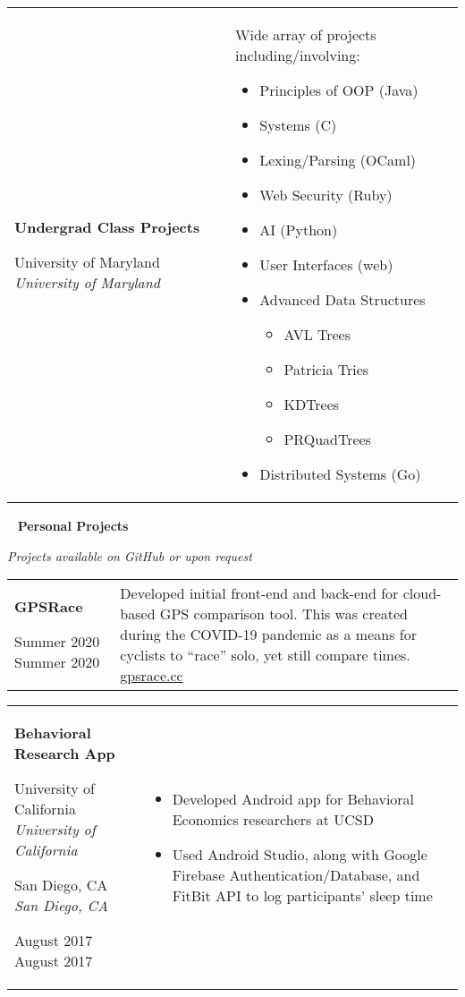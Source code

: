 \documentclass[11pt,letterpaper]{article}
\newcommand{\sect}[1]{
\begin{center}
	\noindent\xrfill[0.7ex]{0.5pt} \mbox{ } {\Large \bf #1} \mbox{ } \xrfill[0.7ex]{0.5pt}
\end{center}
}
\newcommand{\entry}[5]{
	\noindent
	\begin{tabular}{p{2in} p{\dimexpr \linewidth-2\tabcolsep-2.25in}} %
		\noindent \textbf{#1}
		
		\ifx #2  \else \noindent \textit{#2} \fi
		
		\ifx #3  \else \noindent \textit{#3} \fi
		
		\ifx #4  \else \noindent #4 \fi
		&
		#5
	\end{tabular}
	\vspace{0.5cm}
}
\begin{document}
	\entry{Undergrad Class Projects}{University of Maryland}{}{}{
		Wide array of projects including/involving:
		
		\vspace{-1em}
		\begin{multicols}{2}
			\begin{itemize}[nosep, wide]
				\item Principles of OOP (Java)
				\item Systems (C)
				\item Lexing/Parsing (OCaml)
				\item Web Security (Ruby)
				\item AI (Python)
				\item User Interfaces (web)
				\item Advanced Data Structures
				\begin{itemize}[nosep]
					\item AVL Trees
					\item Patricia Tries
					\item KDTrees
					\item PRQuadTrees
				\end{itemize}
				\item Distributed Systems (Go)
			\end{itemize}
		\end{multicols}
	}
	
	\pagebreak
	\sect{Personal Projects}

	\vspace*{-0.5cm}
	\begin{center}
		{\small \textit{Projects available on GitHub or upon request}}
	\end{center}
	
	\entry{GPSRace}{}{}{Summer 2020}{
		Developed initial front-end and back-end for cloud-based GPS comparison tool.
		This was created during the COVID-19 pandemic as a means for cyclists to ``race'' solo, yet still compare times.
		\href{https://gpsrace.cc}{gpsrace.cc}
	}
	
	\entry{Behavioral Research App}{University of California}{San Diego, CA}{August 2017}{
		\begin{itemize}[itemsep=0pt, nosep, wide]
			\item Developed Android app for Behavioral Economics researchers at UCSD
		
			\item Used Android Studio, along with Google Firebase Authentication/Database, and FitBit API to log participants' sleep time
		\end{itemize}
	}
	
\end{document}
